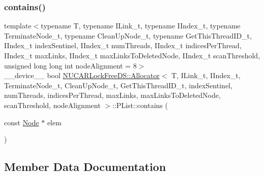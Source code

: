 \subsubsection{\texorpdfstring{contains()}{contains()}}
{\footnotesize\ttfamily template$<$typename T, typename I\+Link\+\_\+t, typename I\+Index\+\_\+t, typename Terminate\+Node\+\_\+t, typename Clean\+Up\+Node\+\_\+t, typename Get\+This\+Thread\+I\+D\+\_\+t, I\+Index\+\_\+t index\+Sentinel, I\+Index\+\_\+t num\+Threads, I\+Index\+\_\+t indices\+Per\+Thread, I\+Index\+\_\+t max\+Links, I\+Index\+\_\+t max\+Links\+To\+Deleted\+Node, I\+Index\+\_\+t scan\+Threshold, unsigned long long int node\+Alignment = 8$>$ \\
\+\_\+\+\_\+device\+\_\+\+\_\+ bool \mbox{\hyperlink{class_n_u_c_a_r_lock_free_d_s_1_1_allocator}{N\+U\+C\+A\+R\+Lock\+Free\+D\+S\+::\+Allocator}}$<$ T, I\+Link\+\_\+t, I\+Index\+\_\+t, Terminate\+Node\+\_\+t, Clean\+Up\+Node\+\_\+t, Get\+This\+Thread\+I\+D\+\_\+t, index\+Sentinel, num\+Threads, indices\+Per\+Thread, max\+Links, max\+Links\+To\+Deleted\+Node, scan\+Threshold, node\+Alignment $>$\+::P\+List\+::contains (\begin{DoxyParamCaption}\item[{const \mbox{\hyperlink{class_n_u_c_a_r_lock_free_d_s_1_1_allocator_1_1_node}{Node}} $\ast$}]{elem }\end{DoxyParamCaption})\hspace{0.3cm}{\ttfamily [inline]}}



\subsection{Member Data Documentation}
\mbox{\label{class_n_u_c_a_r_lock_free_d_s_1_1_allocator_1_1_p_list_a36446eb7ee5bc5173b9877e3baa9a3a4}} 
